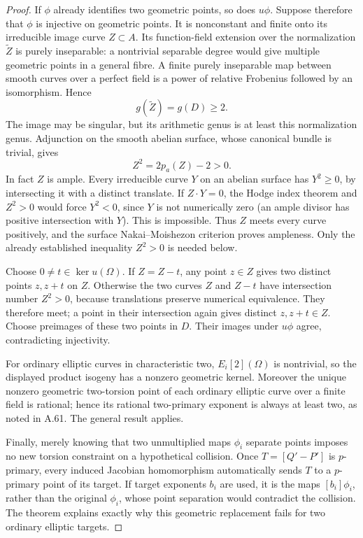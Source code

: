 \documentclass[11pt]{article}
\begin{document}
\begin{proof}
If $\phi$ already identifies two geometric points, so does
$u\phi$. Suppose therefore that $\phi$ is injective on
geometric points. It is nonconstant and finite onto its
irreducible image curve $Z\subset A$. Its function-field
extension over the normalization $\widetilde Z$ is purely
inseparable: a nontrivial separable degree would give
multiple geometric points in a general fibre. A finite
purely inseparable map between smooth curves over a perfect
field is a power of relative Frobenius followed by an
isomorphism. Hence
\[
                g(\widetilde Z)=g(D)\ge2.
\]
The image may be singular, but its arithmetic genus is
at least this normalization genus. Adjunction on the smooth
abelian surface, whose canonical bundle is trivial, gives
\[
                   Z^2=2p_a(Z)-2>0.
\]
In fact $Z$ is ample. Every irreducible curve $Y$ on an
abelian surface has $Y^2\ge0$, by intersecting it with a
distinct translate. If $Z\cdot Y=0$, the Hodge index
theorem and $Z^2>0$ would force $Y^2<0$, since $Y$
is not numerically zero (an ample divisor has positive
intersection with $Y$). This is impossible. Thus $Z$
meets every curve positively, and the surface
Nakai--Moishezon criterion proves ampleness. Only the
already established inequality $Z^2>0$ is needed below.

Choose $0\ne t\in\ker u(\Omega)$. If $Z=Z-t$,
any point $z\in Z$ gives two distinct points $z,z+t$
on $Z$. Otherwise the two curves $Z$ and $Z-t$ have
intersection number $Z^2>0$, because translations preserve
numerical equivalence. They therefore meet; a point in
their intersection again gives distinct $z,z+t\in Z$.
Choose preimages of these two points in $D$. Their images
under $u\phi$ agree, contradicting injectivity.

For ordinary elliptic curves in characteristic two,
$E_i[2](\Omega)$ is nontrivial, so the displayed product
isogeny has a nonzero geometric kernel. Moreover the unique
nonzero geometric two-torsion point of each ordinary
elliptic curve over a finite field is rational; hence its
rational two-primary exponent is always at least two,
as noted in A.61. The general result applies.

Finally, merely knowing that two unmultiplied maps
$\phi_i$ separate points imposes no new torsion constraint
on a hypothetical collision. Once
$T=[Q'-P']$ is $p$-primary, every induced Jacobian
homomorphism automatically sends $T$ to a $p$-primary
point of its target. If target exponents $b_i$ are used,
it is the maps $[b_i]\phi_i$, rather than the original
$\phi_i$, whose point separation would contradict the
collision. The theorem explains exactly why this geometric
replacement fails for two ordinary elliptic targets.
\end{proof}
\end{document}
